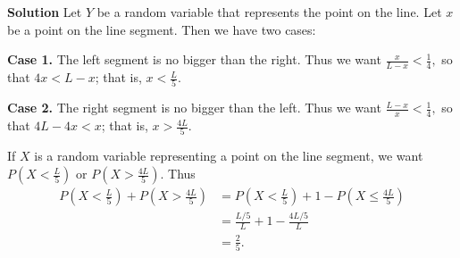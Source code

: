 \documentclass[9pt]{article}
\newcommand{\D}{\displaystyle}
\begin{document}
\begin{enumerate}
      \textbf{Solution} Let $Y$ be a random variable that represents the point
      on the line. Let $x$ be a point on the line segment. Then we have two
      cases:

      \textbf{Case 1.} The left segment is no bigger than the right. Thus we
      want $\D\frac{x}{L - x} < \frac{1}{4},$ so that $4x < L - x$; that is,
      $\D x < \frac{L}{5}$.

      \textbf{Case 2.} The right segment is no bigger than the left. Thus we
      want $\D\frac{L-x}{x} < \frac{1}{4},$ so that $4L - 4x < x$; that is,
      $\D x > \frac{4L}{5}$.

      If $X$ is a random variable representing a point on the line segment, we
      want $\D P\left(X < \frac{L}{5}\right)$ or
      $\D P\left(X > \frac{4L}{5}\right)$. Thus
      \begin{align*}
         P\left(X < \frac{L}{5}\right) + P\left(X > \frac{4L}{5}\right) &=
         P\left(X < \frac{L}{5}\right) + 1 - P\left(X \le \frac{4L}{5}\right) \\
            &= \frac{L/5}{L} + 1 - \frac{4L/5}{L} \\
            &= \frac{2}{5}.
      \end{align*}
\end{enumerate}
\end{document}
